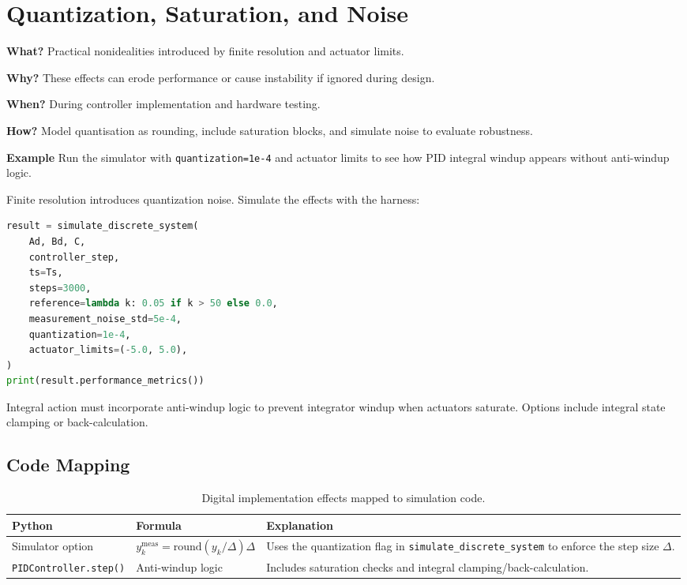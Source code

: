 \section{Quantization, Saturation, and Noise}
\begin{beginnerguide}
    \item[\textbf{What?}] Practical nonidealities introduced by finite resolution and actuator limits.
    \item[\textbf{Why?}] These effects can erode performance or cause instability if ignored during design.
    \item[\textbf{When?}] During controller implementation and hardware testing.
    \item[\textbf{How?}] Model quantisation as rounding, include saturation blocks, and simulate noise to evaluate robustness.
    \item[\textbf{Example}] Run the simulator with \texttt{quantization=1e-4} and actuator limits to see how PID integral windup appears without anti-windup logic.
\end{beginnerguide}
Finite resolution introduces quantization noise. Simulate the effects with the harness:
\begin{lstlisting}[language=python, caption={Quantization impact}]
result = simulate_discrete_system(
    Ad, Bd, C,
    controller_step,
    ts=Ts,
    steps=3000,
    reference=lambda k: 0.05 if k > 50 else 0.0,
    measurement_noise_std=5e-4,
    quantization=1e-4,
    actuator_limits=(-5.0, 5.0),
)
print(result.performance_metrics())
\end{lstlisting}
Integral action must incorporate anti-windup logic to prevent integrator windup when actuators saturate. Options include integral state clamping or back-calculation.

\subsection{Code Mapping}
\begin{table}[h]
    \centering
    \small
    \renewcommand{\arraystretch}{1.2}
    \begin{tabularx}{\linewidth}{|>{\raggedright\arraybackslash}p{4cm}|X|X|}
        \hline
        \textbf{Python} & \textbf{Formula} & \textbf{Explanation} \\
        \hline
        Simulator option & $y_k^\text{meas} = \text{round}(y_k/\Delta) \Delta$ & Uses the quantization flag in \texttt{simulate\_discrete\_system} to enforce the step size $\Delta$. \\
        \hline
        \texttt{PIDController.step()} & Anti-windup logic & Includes saturation checks and integral clamping/back-calculation. \\
        \hline
    \end{tabularx}
    \caption{Digital implementation effects mapped to simulation code.}
\end{table}

